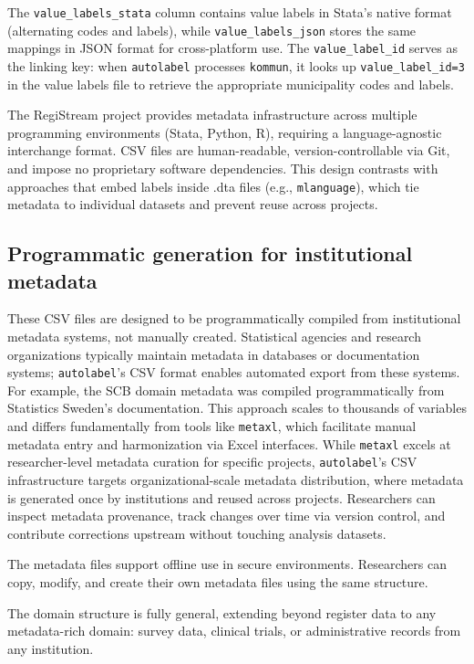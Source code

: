 The \texttt{value\_labels\_stata} column contains value labels in Stata's native format (alternating codes and labels), while \texttt{value\_labels\_json} stores the same mappings in JSON format for cross-platform use. The \texttt{value\_label\_id} serves as the linking key: when \texttt{autolabel} processes \texttt{kommun}, it looks up \texttt{value\_label\_id=3} in the value labels file to retrieve the appropriate municipality codes and labels.

The RegiStream project provides metadata infrastructure across multiple programming environments (Stata, Python, R), requiring a language-agnostic interchange format. CSV files are human-readable, version-controllable via Git, and impose no proprietary software dependencies. This design contrasts with approaches that embed labels inside .dta files (e.g., \texttt{mlanguage}), which tie metadata to individual datasets and prevent reuse across projects.

\subsection{Programmatic generation for institutional metadata}

These CSV files are designed to be programmatically compiled from institutional metadata systems, not manually created. Statistical agencies and research organizations typically maintain metadata in databases or documentation systems; \texttt{autolabel}'s CSV format enables automated export from these systems. For example, the SCB domain metadata was compiled programmatically from Statistics Sweden's documentation. This approach scales to thousands of variables and differs fundamentally from tools like \texttt{metaxl}, which facilitate manual metadata entry and harmonization via Excel interfaces. While \texttt{metaxl} excels at researcher-level metadata curation for specific projects, \texttt{autolabel}'s CSV infrastructure targets organizational-scale metadata distribution, where metadata is generated once by institutions and reused across projects. Researchers can inspect metadata provenance, track changes over time via version control, and contribute corrections upstream without touching analysis datasets.

The metadata files support offline use in secure environments. Researchers can copy, modify, and create their own metadata files using the same structure.

The domain structure is fully general, extending beyond register data to any metadata-rich domain: survey data, clinical trials, or administrative records from any institution.


